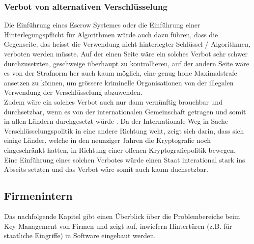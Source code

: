 	
	\subsubsection{Verbot von alternativen Verschlüsselung}
Die Einführung eines Escrow Systemes oder die Einführung einer Hinterlegungspflicht für Algorithmen würde auch dazu führen, dass die Gegenseite, das heisst die Verwendung nicht hinterlegter Schlüssel / Algorithmen, verboten werden müsste. Auf der einen Seite wäre ein solches Verbot sehr schwer durchzusetzten, geschweige überhaupt zu kontrollieren, auf der andern Seite wäre es von der Strafnorm her auch kaum möglich, eine genug hohe Maximalstrafe ansetzen zu können, um grössere kriminelle Organisationen von der illegalen Verwendung der Verschlüsselung abzuwenden. \cite{adminch} \\ %
Zudem wäre ein solches Verbot auch nur dann vernünftig brauchbar und durchsetzbar, wenn es von der internationalen Gemeinschaft getragen und somit in allen Ländern durchgesetzt würde \cite{denning}. Da der Internationale Weg in Sache Verschlüsselungspolitik in eine andere Richtung weht, zeigt sich darin, dass sich einige Länder, welche in den neunziger Jahren die Kryptografie noch eingeschränkt hatten, in Richtung einer offenen Kryptografiepolitik bewegen. \cite{clipperchip} \cite{adminch} \\ %
Eine Einführung eines solchen Verbotes würde einen Staat interational stark ins Abseits setzten und das Verbot wäre somit auch kaum duchsetzbar.
		
	\subsection{Firmenintern}
Das nachfolgende Kapitel gibt einen Überblick über die Problembereiche beim Key Management von Firmen und zeigt auf, inwiefern Hintertüren (z.B. für staatliche Eingriffe) in Software eingebaut werden.

